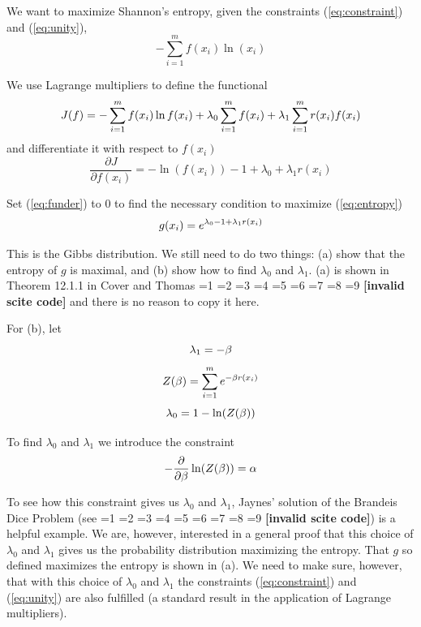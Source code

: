 \documentclass[smallextended]{svjour3}       %
\newcommand{\PageP}{p.~}
\newcommand{\PageP}{}
\newcommand{\scite}[3]{\ifnum#1=1\cite{#2}\else
\ifnum#1=2\cite[{\PageP}~#3]{#2}\else
\ifnum#1=3\cite[{\PageP}~#3]{#2}\else
\ifnum#1=4\cite{#2}\else
\ifnum#1=5\cite{#2}\else
\ifnum#1=6\cite[{\PageP}~#3]{#2}\else
\ifnum#1=7\cite{#2}\else
\ifnum#1=8\cite[{\PageP}~#3]{#2}\else
\ifnum#1=9\cite[{\PageP}~#3]{#2}\else
\textbf{[invalid scite code]}\fi\fi\fi\fi\fi\fi\fi\fi\fi}
\begin{document}
We want to maximize Shannon's entropy, given the constraints
({\ref{eq:constraint}}) and ({\ref{eq:unity}}),
\begin{equation}
  \label{eq:entropy}
-\sum_{i=1}^{m}f(x_{i})\ln(x_{i})
\end{equation}

We use Lagrange multipliers to define the functional
\begin{equation}
  \label{eq:functional}
J(f)=-\sum_{i=1}^{m}f(x_{i})\ln{}f(x_{i})+\lambda_{0}\sum_{i=1}^{m}f(x_{i})+\lambda_{1}\sum_{i=1}^{m}r(x_{i})f(x_{i})\notag
\end{equation}
and differentiate it with respect to $f(x_{i})$
\begin{equation}
  \label{eq:funder}
\frac{\partial{}J}{\partial{}f(x_{i})}=-\ln(f(x_{i}))-1+\lambda_{0}+\lambda_{1}r(x_{i})
\end{equation}

Set ({\ref{eq:funder}}) to $0$ to find the necessary condition to
maximize ({\ref{eq:entropy}})
\begin{equation}
  \label{eq:coverthomas}
g(x_{i})=e^{\lambda_{0}-1+\lambda_{1}r(x_{i})}\notag
\end{equation}

This is the Gibbs distribution. We still need to do two things: (a)
show that the entropy of $g$ is maximal, and (b) show how to find
$\lambda_{0}$ and $\lambda_{1}$. (a) is shown in Theorem 12.1.1 in
Cover and Thomas \scite{1}{coverthomas06}{} and there is no reason to
copy it here. 

For (b), let
\begin{equation}
  \label{eq:l1}
\lambda_{1}=-\beta\notag
\end{equation}
\begin{equation}
  \label{eq:zet}
Z(\beta)=\sum_{i=1}^{m}e^{-\beta{}r(x_{i})}\notag
\end{equation}
\begin{equation}
  \label{eq:l0}
\lambda_{0}=1-\ln(Z(\beta))\notag
\end{equation}

To find $\lambda_{0}$ and $\lambda_{1}$ we introduce the constraint
\begin{equation}
  \label{eq:logcon}
-\frac{\partial}{\partial{}\beta}\ln(Z(\beta))=\alpha\notag
\end{equation}

To see how this constraint gives us $\lambda_{0}$ and $\lambda_{1}$,
Jaynes' solution of the Brandeis Dice Problem (see
\scite{8}{jaynes89}{243}) is a helpful example. We are, however,
interested in a general proof that this choice of $\lambda_{0}$ and
$\lambda_{1}$ gives us the probability distribution maximizing the
entropy. That $g$ so defined maximizes the entropy is shown in (a). We
need to make sure, however, that with this choice of $\lambda_{0}$ and
$\lambda_{1}$ the constraints ({\ref{eq:constraint}}) and
({\ref{eq:unity}}) are also fulfilled (a standard result in the
application of Lagrange multipliers).
\end{document}
